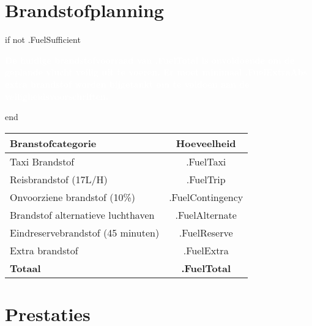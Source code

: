 \documentclass[12pt]{article}
\begin{document}
\newpage
\section*{Brandstofplanning}


{{ if not .FuelSufficient }}
{\small
\noindent
\colorbox{red!80}{%
\parbox{\textwidth}{%
\centering
{\textcolor{white}{\textbf{
De huidige brandstofvoorraad van {{ .FuelTotal }} is onvoldoende om de geplande vlucht veilig uit te
voeren. Er moet minimaal {{ .FuelExtraAbs }} extra brandstof worden bijgetankt om te voldoen
aan de veiligheidsvoorschriften.
}}}%
}%
}
}
{{ end }}

{\small
\begin{table}[H]
\centering
\renewcommand{\arraystretch}{1.5}
\setlength{\tabcolsep}{10pt}
\begin{tabular}{|l|c|}
\hline
\rowcolor[HTML]{AAAAAA}
\textbf{Branstofcategorie} & \textbf{Hoeveelheid} \\ \hline
Taxi Brandstof & {{ .FuelTaxi }}           \\ \hline
Reisbrandstof (17L/H) & {{ .FuelTrip }}           \\ \hline
Onvoorziene brandstof (10\%) & {{ .FuelContingency }}           \\ \hline
Brandstof alternatieve luchthaven & {{ .FuelAlternate }}           \\ \hline
Eindreservebrandstof (45 minuten) & {{ .FuelReserve }}           \\ \hline
Extra brandstof & {{ .FuelExtra }}           \\ \hline
\rowcolor[HTML]{AAAAAA}
\textbf{Totaal} & \textbf{ {{ .FuelTotal }} } \\ \hline
\end{tabular}
\end{table}
}

\section*{Prestaties}
\end{document}
